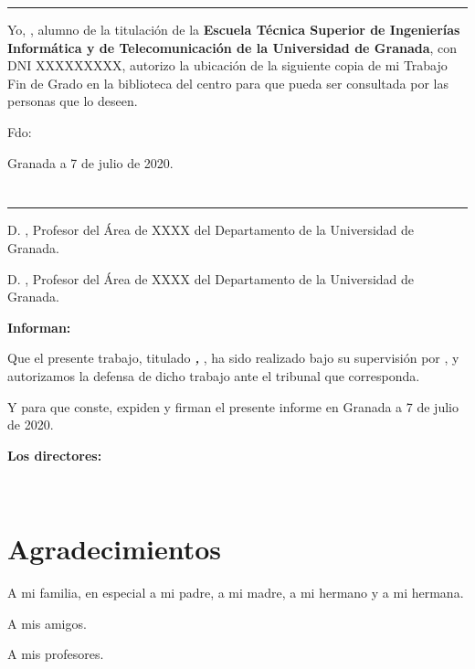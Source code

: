 \noindent\rule[-1ex]{\textwidth}{2pt}\bigskip\bigskip\bigskip

Yo, \textbf\myName, alumno de la titulación \myDegree de la \textbf{Escuela Técnica Superior
de Ingenierías Informática y de Telecomunicación de la Universidad de Granada}, con DNI XXXXXXXXX, autorizo la
ubicación de la siguiente copia de mi Trabajo Fin de Grado en la biblioteca del centro para que pueda ser
consultada por las personas que lo deseen.

\vspace{6cm}

\noindent Fdo: \myName

\vspace{2cm}

\begin{flushright}
Granada a 7 de julio de 2020.
\end{flushright}


\chapter*{}
\thispagestyle{empty}

\noindent\rule[-1ex]{\textwidth}{2pt}\bigskip\bigskip\bigskip

D. \textbf\myProf, Profesor del Área de XXXX del Departamento \myDepartment de la Universidad de Granada.

\vspace{0.5cm}

D. \textbf\myOtherProf, Profesor del Área de XXXX del Departamento \myDepartment de la Universidad de Granada.


\vspace{0.5cm}

\textbf{Informan:}

\vspace{0.5cm}

Que el presente trabajo, titulado \textit{\textbf{\myTitle, \mySubTitle}},
ha sido realizado bajo su supervisión por \textbf{\myName}, y autorizamos la defensa de dicho trabajo ante el tribunal
que corresponda.

\vspace{0.5cm}

Y para que conste, expiden y firman el presente informe en Granada a 7 de julio de 2020.

\vspace{1cm}

\textbf{Los directores:}

\vspace{5cm}

\noindent \textbf{\myProf \ \ \ \ \ \myOtherProf}

\chapter*{Agradecimientos}
\thispagestyle{empty}

       \vspace{1cm}


A mi familia, en especial a mi padre, a mi madre, a mi hermano y a mi hermana. 

A mis amigos.

A mis profesores.


